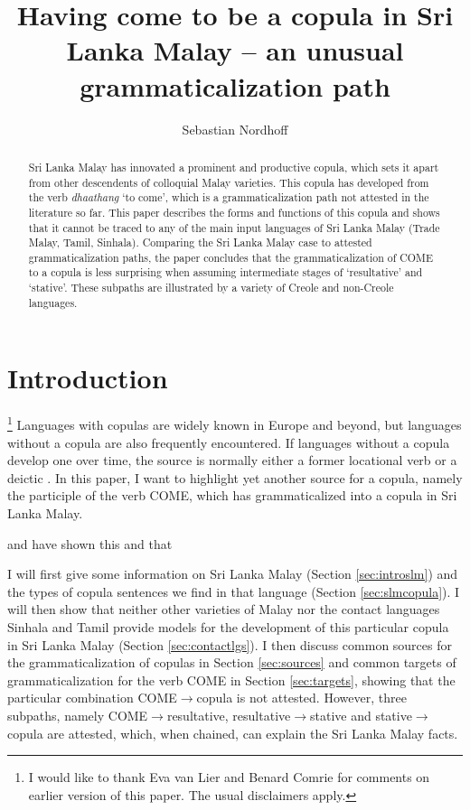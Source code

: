 \documentclass[a4paper,12pt]{article}
\title{Having come to be a copula in Sri Lanka Malay -- an unusual grammaticalization path}
\author{Sebastian Nordhoff}
\newcommand{\trs}[2]{{\em #1\em} `#2'}
\begin{document}
\maketitle

\begin{abstract}
Sri Lanka Malay has innovated a prominent and productive copula, which sets it apart from other descendents of colloquial Malay varieties. This copula has developed from the verb \trs{dhaathang}{to come}, which is a grammaticalization path not attested in the literature so far. This paper describes the forms and functions of this copula and shows that it cannot be traced to any of the main input languages of Sri Lanka Malay (Trade Malay, Tamil, Sinhala). Comparing the Sri Lanka Malay case to attested grammaticalization paths, the paper concludes that the grammaticalization of COME to a copula is less surprising when assuming intermediate stages of `resultative' and `stative'. These subpaths are illustrated by a variety of Creole and non-Creole languages.
\end{abstract}

\section{Introduction}
\thanks{I would like to thank Eva van Lier and Benard Comrie for comments on earlier version of this paper. The usual disclaimers apply.}
Languages with copulas are widely known in Europe and beyond, but languages without a copula are also frequently encountered. If languages without a copula develop one over time, the source is normally either a former locational verb or a deictic \citep[91]{Stassen1997}. In this paper, I want to highlight yet another source for a copula, namely the participle of the verb COME, which has grammaticalized into a copula in Sri Lanka Malay.
 
\citet{Slomanson2006cll} and \citet{Ansaldo2005ms} have shown this and that

I will first give some information on Sri Lanka Malay (Section \ref{sec:introslm})
and the types of copula sentences we find in that language (Section \ref{sec:slmcopula}).
I will then show that neither other varieties of Malay nor the contact languages Sinhala and Tamil provide models for the development of this particular copula in Sri Lanka Malay (Section \ref{sec:contactlgs}). I then discuss common sources for the grammaticalization of copulas in Section \ref{sec:sources} and common targets of grammaticalization for the verb COME in Section \ref{sec:targets}, showing that the particular combination COME$\to$copula is not attested. However, three subpaths, namely  COME$\to$resultative, resultative$\to$stative and stative$\to$copula are attested, which, when chained, can explain the Sri Lanka Malay facts.
\end{document}
